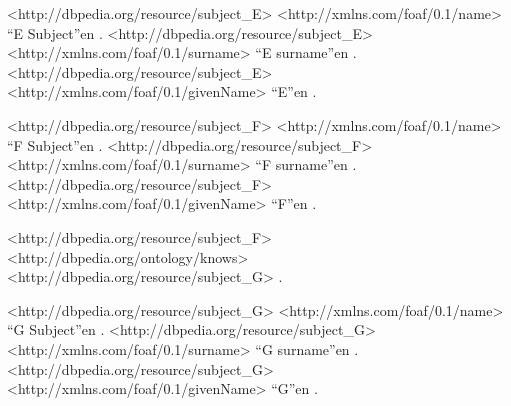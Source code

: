 \begin{listing}[
  language = XML,
  numbers=left,
  numberstyle=\tiny,
  stepnumber=5,
  numbersep=5pt,
  frame=single,
  caption  = {Datos utilizados para el ejemplo SchemaCompleteness},
  label    = ex:scdata]
<http://dbpedia.org/resource/subject_E> <http://xmlns.com/foaf/0.1/name> ``E Subject''en .
<http://dbpedia.org/resource/subject_E> <http://xmlns.com/foaf/0.1/surname> ``E surname''en .
<http://dbpedia.org/resource/subject_E> <http://xmlns.com/foaf/0.1/givenName> ``E''en .

<http://dbpedia.org/resource/subject_F> <http://xmlns.com/foaf/0.1/name> ``F Subject''en .
<http://dbpedia.org/resource/subject_F> <http://xmlns.com/foaf/0.1/surname> ``F surname''en .
<http://dbpedia.org/resource/subject_F> <http://xmlns.com/foaf/0.1/givenName> ``F''en .

<http://dbpedia.org/resource/subject_F> <http://dbpedia.org/ontology/knows> <http://dbpedia.org/resource/subject_G> .

<http://dbpedia.org/resource/subject_G> <http://xmlns.com/foaf/0.1/name> ``G Subject''en .
<http://dbpedia.org/resource/subject_G> <http://xmlns.com/foaf/0.1/surname> ``G surname''en .
<http://dbpedia.org/resource/subject_G> <http://xmlns.com/foaf/0.1/givenName> ``G''en .
\end{listing}

